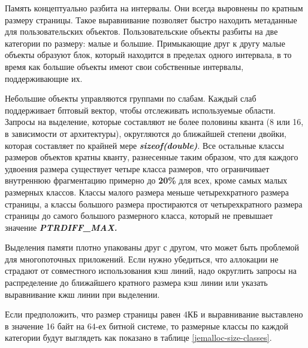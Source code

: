 Память концептуально разбита на интервалы. Они всегда выровнены по кратным размеру страницы. Такое выравнивание позволяет быстро находить метаданные для пользовательских объектов. Пользовательские объекты разбиты на две категории по размеру: малые и большие. Примыкающие друг к другу малые объекты образуют блок, который находится в пределах одного интервала, в то время как большие объекты имеют свои собственные интервалы, поддерживающие их.

Небольшие объекты управляются группами по слабам. Каждый слаб поддерживает бптовый вектор, чтобы отслеживать используемые области. Запросы на выделение, которые составляют не более половины кванта (8 или 16, в зависимости от архитектуры), округляются до ближайшей степени двойки, которая составляет по крайней мере \textit{\textbf{sizeof(double)}}. Все остальные классы размеров объектов кратны кванту, разнесенные таким образом, что для каждого удвоения размера существует четыре класса размеров, что ограничивает внутреннюю фрагментацию примерно до \textbf{20\%} для всех, кроме самых малых размерных классов. Классы малого размера меньше четырехкратного размера страницы, а классы большого размера простираются от четырехкратного размера страницы до самого большого размерного класса, который не превышает значение \textit{\textbf{PTRDIFF\_MAX.}}

Выделения памяти плотно упакованы друг с другом, что может быть проблемой для многопоточных приложений. Если нужно убедиться, что аллокации не страдают от совместного использования кэш линий, надо округлить запросы на распределение до ближайшего кратного размера кэш линии или указать выравнивание кжш линии при выделении.

Если предположить, что размер страницы равен 4КБ и выравнивание выставлено в значение 16 байт на 64-ех битной системе, то размерные классы по каждой категории будут выглядеть как показано в таблице \ref{jemalloc-size-classes}.


